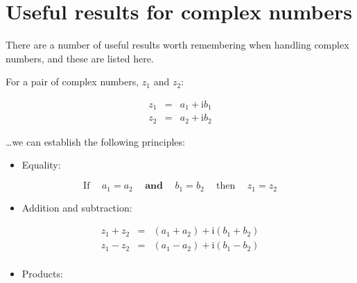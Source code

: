 \documentclass[
]{book}
\providecommand{\tightlist}{%
  \setlength{\itemsep}{0pt}\setlength{\parskip}{0pt}}
\begin{document}
\hypertarget{sec-ch3-complexusefulresults}{%
\section{Useful results for complex numbers}\label{sec-ch3-complexusefulresults}}

There are a number of useful results worth remembering when handling complex numbers, and these are listed here.

For a pair of complex numbers, \(z_1\) and \(z_2\):

\begin{equation}
\begin{array}{rcl}
z_1 &=& a_1 + \mathrm{i}b_1 \\
z_2 &=& a_2 + \mathrm{i}b_2 
\end{array}
\label{eq:ch3-complexnumber4}
\end{equation}

\ldots we can establish the following principles:

\begin{itemize}
\tightlist
\item
  Equality:
\end{itemize}

\begin{equation}
\textrm{If} \hspace{15pt} a_1 = a_2 \hspace{15pt} \textbf{and} \hspace{15pt} b_1 = b_2  \hspace{15pt} \textrm{then}  \hspace{15pt} z_1 = z_2
\end{equation}

\begin{itemize}
\tightlist
\item
  Addition and subtraction:
\end{itemize}

\begin{equation}
\begin{array}{rcl}
z_1 + z_2 &=& (a_1 + a_2) + \mathrm{i}(b_1 + b_2) \\
z_1 - z_2 &=& (a_1 - a_2) + \mathrm{i}(b_1 - b_2) \\
\end{array}
\end{equation}

\begin{itemize}
\tightlist
\item
  Products:
\end{itemize}
\end{document}
